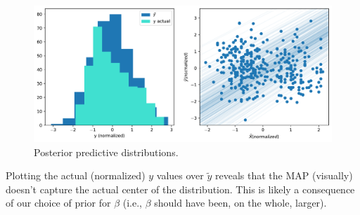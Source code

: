 \begin{figure}[H]
    \centering
    \includegraphics[width=0.8\linewidth]{data/05_reporting/problem_set_2/posterior_predictive.pdf}
    \caption{Posterior predictive distributions.}
    \label{fig:posterior-predictive}
\end{figure}


Plotting the actual (normalized) $y$ values over $\tilde{y}$ reveals that the MAP (visually) doesn't capture the actual center of the distribution. This is likely a consequence of our choice of prior for $\beta$ (i.e., $\beta$ should have been, on the whole, larger). 